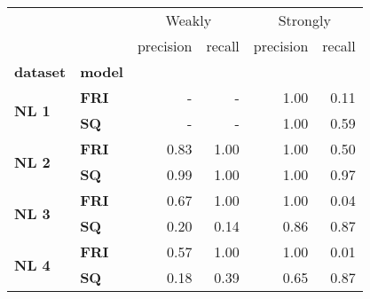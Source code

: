 \begin{tabular}{llrrrr}
\toprule
     &    & \multicolumn{2}{c}{Weakly} & \multicolumn{2}{c}{Strongly} \\
     &    & precision & recall & precision & recall \\
\textbf{dataset} & \textbf{model} &           &        &           &        \\
\midrule
\multirow{2}{*}{\textbf{NL 1}} & \textbf{FRI} &         - &      - &      1.00 &   0.11 \\
     & \textbf{SQ} &         - &      - &      1.00 &   0.59 \\
\cline{1-6}
\multirow{2}{*}{\textbf{NL 2}} & \textbf{FRI} &      0.83 &   1.00 &      1.00 &   0.50 \\
     & \textbf{SQ} &      0.99 &   1.00 &      1.00 &   0.97 \\
\cline{1-6}
\multirow{2}{*}{\textbf{NL 3}} & \textbf{FRI} &      0.67 &   1.00 &      1.00 &   0.04 \\
     & \textbf{SQ} &      0.20 &   0.14 &      0.86 &   0.87 \\
\cline{1-6}
\multirow{2}{*}{\textbf{NL 4}} & \textbf{FRI} &      0.57 &   1.00 &      1.00 &   0.01 \\
     & \textbf{SQ} &      0.18 &   0.39 &      0.65 &   0.87 \\
\bottomrule
\end{tabular}
